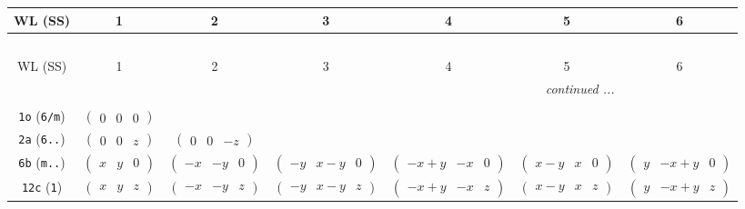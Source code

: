 \documentclass[fleqn,9pt,landscape]{jsarticle}
\begin{document}
\begin{center}
\renewcommand{\arraystretch}{1.2}
\begin{longtable}{ccccccc}
 \hline \hline
WL (SS) & 1 & 2 & 3 & 4 & 5 & 6 \\ \hline \endfirsthead

\multicolumn{6}{l}{\tablename\ \thetable{}} \\
 \hline \hline
WL (SS) & 1 & 2 & 3 & 4 & 5 & 6 \\ \hline \endhead

 \hline \hline
\multicolumn{6}{r}{\footnotesize\it continued ...} \\ \endfoot

 \hline \hline
\multicolumn{6}{r}{} \\ \endlastfoot

{\tt 1o} ({\tt 6/m}) & $ \begin{pmatrix} 0 & 0 & 0 \end{pmatrix} $ & $  $ & $  $ & $  $ & $  $ & $  $ \\ \hline
{\tt 2a} ({\tt 6..}) & $ \begin{pmatrix} 0 & 0 & z \end{pmatrix} $ & $ \begin{pmatrix} 0 & 0 & - z \end{pmatrix} $ & $  $ & $  $ & $  $ & $  $ \\ \hline
{\tt 6b} ({\tt m..}) & $ \begin{pmatrix} x & y & 0 \end{pmatrix} $ & $ \begin{pmatrix} - x & - y & 0 \end{pmatrix} $ & $ \begin{pmatrix} - y & x - y & 0 \end{pmatrix} $ & $ \begin{pmatrix} - x + y & - x & 0 \end{pmatrix} $ & $ \begin{pmatrix} x - y & x & 0 \end{pmatrix} $ & $ \begin{pmatrix} y & - x + y & 0 \end{pmatrix} $ \\ \hline
{\tt 12c} ({\tt 1}) & $ \begin{pmatrix} x & y & z \end{pmatrix} $ & $ \begin{pmatrix} - x & - y & z \end{pmatrix} $ & $ \begin{pmatrix} - y & x - y & z \end{pmatrix} $ & $ \begin{pmatrix} - x + y & - x & z \end{pmatrix} $ & $ \begin{pmatrix} x - y & x & z \end{pmatrix} $ & $ \begin{pmatrix} y & - x + y & z \end{pmatrix} $ \\

\end{longtable}
\end{center}
\end{document}
